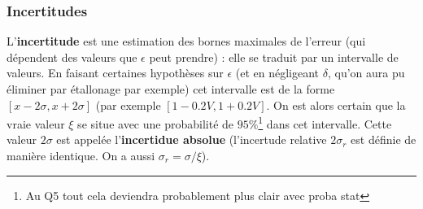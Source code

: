 \subsubsection*{Incertitudes}
L'\textbf{incertitude} est une estimation des bornes maximales de l'erreur (qui dépendent des valeurs que $\epsilon$ peut prendre) : elle se traduit par un intervalle de valeurs. En faisant certaines hypothèses sur $\epsilon$ (et en négligeant $\delta$, qu'on aura pu éliminer par étallonage par exemple) cet intervalle est de la forme $[x - 2\sigma, x + 2\sigma]$ (par exemple $[1 - 0.2 V, 1 + 0.2 V]$. On est alors certain que la vraie valeur $\xi$ se situe avec une probabilité de $95\%$\footnote{Au Q5 tout cela deviendra probablement plus clair avec proba stat} dans cet intervalle. Cette valeur $2 \sigma$ est appelée l'\textbf{incertidue absolue} (l'incertude relative $ 2\sigma_r$ est définie de manière identique. On a aussi $\sigma_r = \sigma / \xi$).

